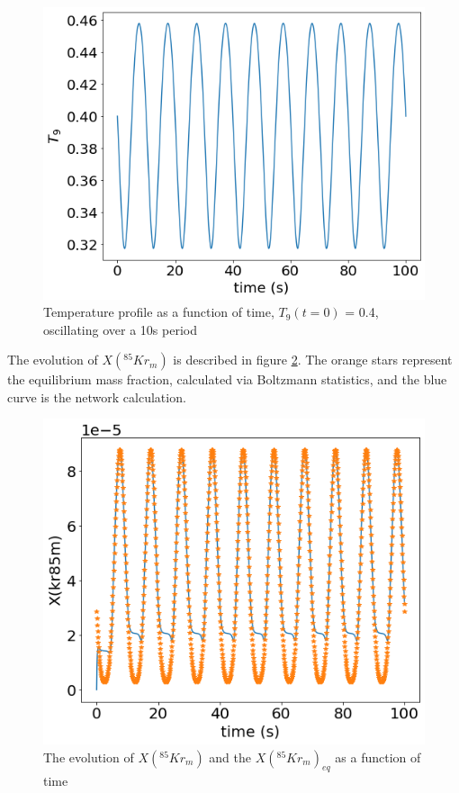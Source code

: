 \documentclass{article}
\begin{document}
\begin{figure}[H]
    \centerline{\includegraphics[scale = 0.5]{images/temp_profile.png}}
    \caption{Temperature profile as a function of time, $T_{9}(t=0)$ = 0.4, oscillating over a 10s period}
    \label{temp}
\end{figure}

The evolution of $X(^{85}Kr_{m})$ is described in figure \ref{mfrac}. The orange stars represent the equilibrium mass fraction, calculated 
via Boltzmann statistics, and the blue curve is the network calculation.

\begin{figure}[H]
    \centerline{\includegraphics[scale = 0.5]{images/mass_frac.png}}
    \caption{The evolution of $X(^{85}Kr_{m})$ and the $X(^{85}Kr_{m})_{eq}$ as a function of time}
    \label{mfrac}
\end{figure}
\end{document}
